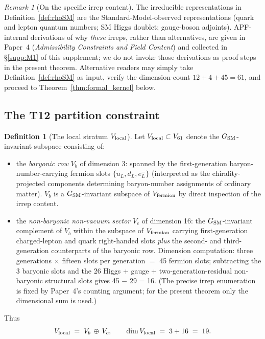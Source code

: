 \documentclass[11pt]{article}
\theoremstyle{plain}
\theoremstyle{definition}
\newtheorem{definition}[theorem]{Definition}
\theoremstyle{remark}
\newtheorem{remark}[theorem]{Remark}
\newcommand{\paperref}[2]{Paper~#1 (\emph{#2})}
\begin{document}
\begin{remark}[On the specific irrep content]\label{rem:irrep_content}
The irreducible representations in Definition~\ref{def:rhoSM} are the Standard-Model-observed representations (quark and lepton quantum numbers; SM Higgs doublet; gauge-boson adjoints).  APF-internal derivations of why \emph{these} irreps, rather than alternatives, are given in \paperref{4}{Admissibility Constraints and Field Content} and collected in \S\ref{supp:M1} of this supplement; we do not invoke those derivations as proof steps in the present theorem.  Alternative readers may simply take Definition~\ref{def:rhoSM} as input, verify the dimension-count $12 + 4 + 45 = 61$, and proceed to Theorem~\ref{thm:formal_kernel} below.
\end{remark}

\bigskip

\subsection{The T12 partition constraint}\label{supp:kernel_T12}

\begin{definition}[The local stratum $V_{\rm local}$]\label{def:Vlocal}
Let $V_{\rm local} \subset V_{61}$ denote the $G_{\rm SM}$-invariant subspace consisting of:
\begin{itemize}[leftmargin=2em,itemsep=2pt]
  \item the \emph{baryonic row} $V_b$ of dimension 3: spanned by the first-generation baryon-number-carrying fermion slots $\{u_L, d_L, e_L^-\}$ (interpreted as the chirality-projected components determining baryon-number assignments of ordinary matter).  $V_b$ is a $G_{\rm SM}$-invariant subspace of $V_{\rm fermion}$ by direct inspection of the irrep content.
  \item the \emph{non-baryonic non-vacuum sector} $V_c$ of dimension 16: the $G_{\rm SM}$-invariant complement of $V_b$ within the subspace of $V_{\rm fermion}$ carrying first-generation charged-lepton and quark right-handed slots \emph{plus} the second- and third-generation counterparts of the baryonic row.  Dimension computation: three generations $\times$ fifteen slots per generation $=$ 45 fermion slots; subtracting the 3 baryonic slots and the 26 Higgs + gauge + two-generation-residual non-baryonic structural slots gives 45 $-$ 29 = 16. (The precise irrep enumeration is fixed by Paper~4's counting argument; for the present theorem only the dimensional sum is used.)
\end{itemize}
Thus
\[
  V_{\rm local} \;=\; V_b \,\oplus\, V_c,
  \qquad \dim V_{\rm local} \;=\; 3 + 16 \;=\; 19.
\]
\end{definition}
\end{document}
